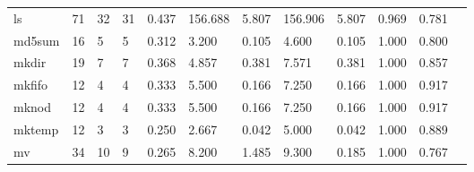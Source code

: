 \begin{longtable}{lp{1.00cm}p{1.00cm}p{1.00cm}p{1.00cm}p{1.00cm}p{1.00cm}p{1.00cm}p{1.00cm}p{1.00cm}p{1.00cm}p{1.00cm}}
ls        &                           71 &                 32 &                                31 &                                      0.437 &                                156.688 &                                        5.807 &                           156.906 &                                   5.807 &                        0.969 &                                        0.781 \\
md5sum    &                           16 &                  5 &                                 5 &                                      0.312 &                                  3.200 &                                        0.105 &                             4.600 &                                   0.105 &                        1.000 &                                        0.800 \\
mkdir     &                           19 &                  7 &                                 7 &                                      0.368 &                                  4.857 &                                        0.381 &                             7.571 &                                   0.381 &                        1.000 &                                        0.857 \\
mkfifo    &                           12 &                  4 &                                 4 &                                      0.333 &                                  5.500 &                                        0.166 &                             7.250 &                                   0.166 &                        1.000 &                                        0.917 \\
mknod     &                           12 &                  4 &                                 4 &                                      0.333 &                                  5.500 &                                        0.166 &                             7.250 &                                   0.166 &                        1.000 &                                        0.917 \\
mktemp    &                           12 &                  3 &                                 3 &                                      0.250 &                                  2.667 &                                        0.042 &                             5.000 &                                   0.042 &                        1.000 &                                        0.889 \\
mv        &                           34 &                 10 &                                 9 &                                      0.265 &                                  8.200 &                                        1.485 &                             9.300 &                                   0.185 &                        1.000 &                                        0.767 \\

\end{longtable}
